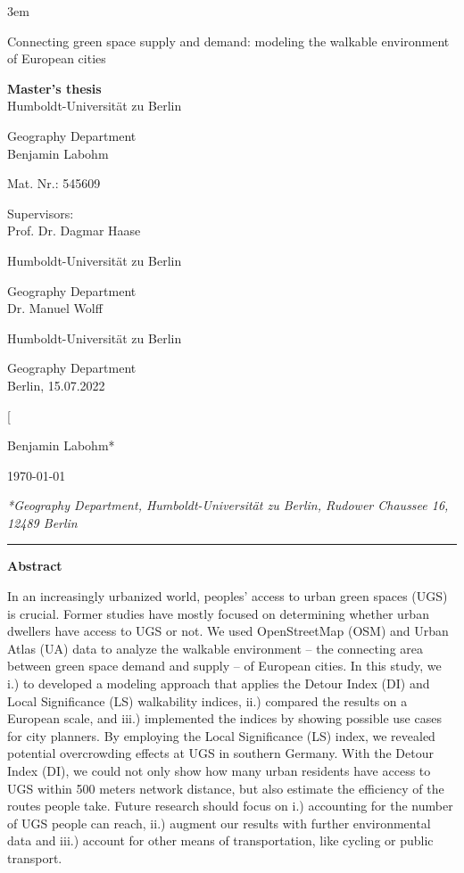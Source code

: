 \documentclass[10pt]{article}
\begin{document}
\emergencystretch 3em
\onecolumn

{\center
\vspace*{5cm}
{\Huge Connecting green space supply and demand: modeling the walkable environment of European cities}
\par\bigskip
\Large{
\textbf{Master's thesis}\\
Humboldt-Universit\"at zu Berlin

Geography Department
\\
Benjamin Labohm

Mat. Nr.: 
545609
\vfill
}
}
\large{


Supervisors: \\
Prof. Dr. Dagmar Haase

Humboldt-Universit\"at zu Berlin

Geography Department\\


Dr. Manuel Wolff

Humboldt-Universit\"at zu Berlin

Geography Department \\

Berlin, 15.07.2022
}

\newpage
\normalsize
\tableofcontents
\newpage
\listoffigures
\newpage

\twocolumn[{\vspace{3ex}
	{\large Benjamin Labohm*\par}\vspace{2ex}
	\today\par\vspace{4ex}}
\textit{\small{*Geography Department, Humboldt-Universit\"at zu Berlin, Rudower Chaussee 16, 12489 Berlin}} \\
\smallbreak
\hrule 

\vspace*{.5cm}

\textbf{Abstract}

In an increasingly urbanized world, peoples’ access to urban green spaces (UGS) is crucial. 
Former studies have mostly focused on determining whether urban dwellers have access to UGS or not.
We used OpenStreetMap (OSM) and Urban Atlas (UA) data to analyze the walkable environment – the connecting area between green space demand and supply – of European cities. 
In this study, we i.) to developed a modeling approach that applies the Detour Index (DI) and Local Significance (LS) walkability indices, ii.) compared the results on a European scale, and iii.) implemented the indices by showing possible use cases for city planners.
By employing the Local Significance (LS) index, we revealed potential overcrowding effects at UGS in southern Germany.
With the Detour Index (DI), we could not only show how many urban residents have access to UGS within 500 meters network distance, but also estimate the efficiency of the routes people take. 
Future research should focus on i.) accounting for the number of UGS people can reach, ii.) augment our results with further environmental data and iii.) account for other means of transportation, like cycling or public transport.
\end{document}
